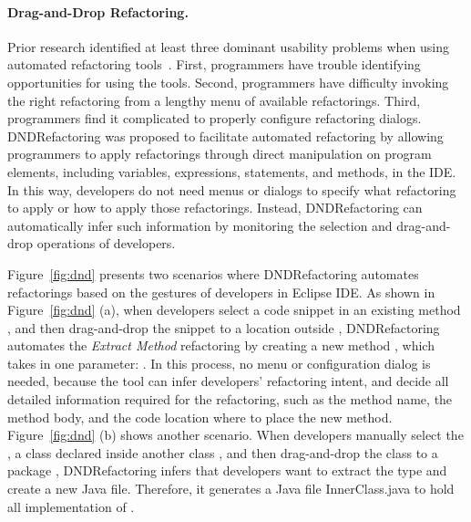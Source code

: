 \paragraph{Drag-and-Drop Refactoring.} Prior research identified at least three dominant usability problems when using automated refactoring tools~\cite{OConnor:2005,Mealy:2007,Parnin:2008,Murphy-Hill:2008,Murphy-Hill:2011,Vakilian:2012}. First, programmers have trouble identifying opportunities for using the tools. Second, programmers have difficulty invoking the right refactoring from a lengthy menu of available refactorings. Third, programmers find it complicated to properly configure refactoring dialogs. DNDRefactoring was proposed to facilitate automated refactoring by allowing programmers to apply refactorings through direct manipulation on program elements, including variables, expressions, statements, and methods, in the IDE. In this way, developers do not need menus or dialogs to specify what refactoring to apply or how to apply those refactorings. Instead, DNDRefactoring can automatically infer such information by monitoring the selection and drag-and-drop operations of developers.

Figure~\ref{fig:dnd} presents two scenarios where DNDRefactoring automates refactorings based on the gestures of developers in Eclipse IDE. As shown in Figure~\ref{fig:dnd} (a), when developers select a code snippet in an existing method , and then drag-and-drop the snippet to a location outside , DNDRefactoring automates the \emph{Extract Method} refactoring by creating a new method , which takes in one parameter: . In this process, no menu or configuration dialog is needed, because the tool can infer developers' refactoring intent, and decide all detailed information required for the refactoring, such as the method name, the method body, and the code location where to place the new method. Figure~\ref{fig:dnd} (b) shows another scenario. When developers manually select the , a class declared inside another class , and then drag-and-drop the class to a package , DNDRefactoring infers that developers want to extract the type and create a new Java file. Therefore, it generates a Java file InnerClass.java to hold all implementation of .

